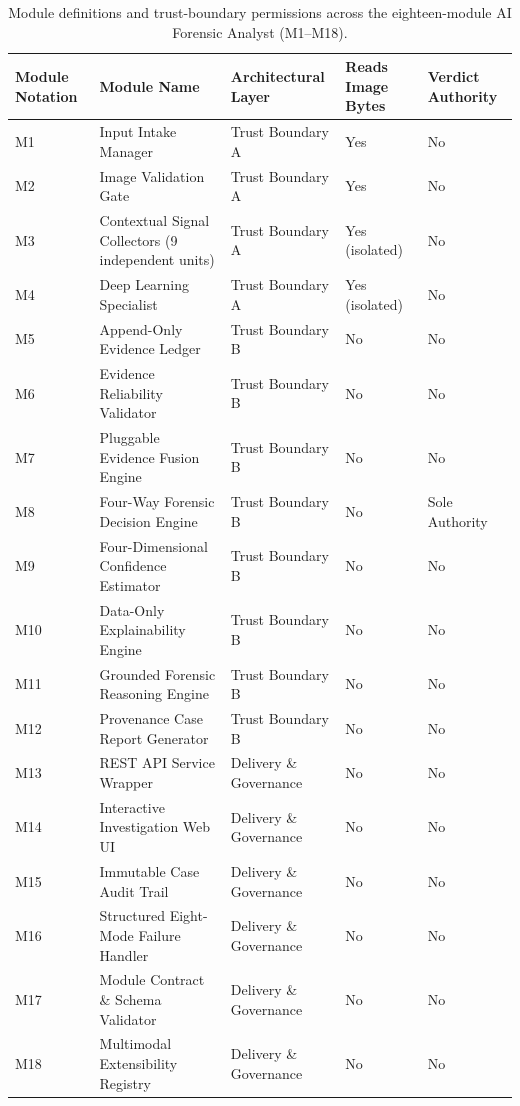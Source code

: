 \documentclass[final,5p,times,twocolumn,numafflabel]{elsarticle}
\begin{document}
\begin{table}[t]
\centering
\caption{Module definitions and trust-boundary permissions across the eighteen-module AI Forensic Analyst (M1--M18).}
\label{tab:modules}
\scriptsize
\setlength{\tabcolsep}{6pt}
\renewcommand{\arraystretch}{1.12}
\begin{tabularx}{\textwidth}{@{}l X l l l@{}}
\toprule
\textbf{Module Notation} & \textbf{Module Name} & \textbf{Architectural Layer} & \textbf{Reads Image Bytes} & \textbf{Verdict Authority} \\
\midrule
M1 & Input Intake Manager & Trust Boundary A & Yes & No \\
M2 & Image Validation Gate & Trust Boundary A & Yes & No \\
M3 & Contextual Signal Collectors (9 independent units) & Trust Boundary A & Yes (isolated) & No \\
M4 & Deep Learning Specialist & Trust Boundary A & Yes (isolated) & No \\
M5 & Append-Only Evidence Ledger & Trust Boundary B & No & No \\
M6 & Evidence Reliability Validator & Trust Boundary B & No & No \\
M7 & Pluggable Evidence Fusion Engine & Trust Boundary B & No & No \\
M8 & Four-Way Forensic Decision Engine & Trust Boundary B & No & Sole Authority \\
M9 & Four-Dimensional Confidence Estimator & Trust Boundary B & No & No \\
M10 & Data-Only Explainability Engine & Trust Boundary B & No & No \\
M11 & Grounded Forensic Reasoning Engine & Trust Boundary B & No & No \\
M12 & Provenance Case Report Generator & Trust Boundary B & No & No \\
M13 & REST API Service Wrapper & Delivery \& Governance & No & No \\
M14 & Interactive Investigation Web UI & Delivery \& Governance & No & No \\
M15 & Immutable Case Audit Trail & Delivery \& Governance & No & No \\
M16 & Structured Eight-Mode Failure Handler & Delivery \& Governance & No & No \\
M17 & Module Contract \& Schema Validator & Delivery \& Governance & No & No \\
M18 & Multimodal Extensibility Registry & Delivery \& Governance & No & No \\
\bottomrule
\end{tabularx}
\end{table}
\end{document}
